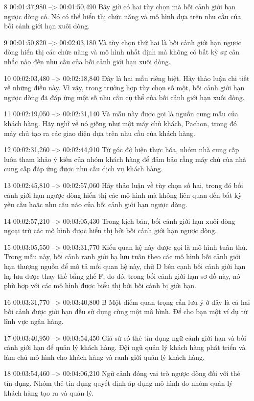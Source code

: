 8
00:01:37,980 --> 00:01:50,490
Bây giờ có hai tùy chọn mà bối cảnh giới hạn ngược dòng có.  Nó có thể hiển thị chức năng và mô hình dựa trên nhu cầu của bối cảnh giới hạn xuôi dòng.

9
00:01:50,820 --> 00:02:03,180
Và tùy chọn thứ hai là bối cảnh giới hạn ngược dòng hiển thị các chức năng và mô hình nhất định mà không có bất kỳ sự cân nhắc nào đến nhu cầu của bối cảnh giới hạn xuôi dòng.

10
00:02:03,480 --> 00:02:18,840
Đây là hai mẫu riêng biệt.  Hãy thảo luận chi tiết về những điều này.  Vì vậy, trong trường hợp tùy chọn số một, bối cảnh giới hạn ngược dòng đã đáp ứng một số nhu cầu cụ thể của bối cảnh giới hạn xuôi dòng.

11
00:02:19,050 --> 00:02:31,140
Và mẫu này được gọi là nguồn cung mẫu của khách hàng.  Hãy nghĩ về nó giống như một máy chủ khách, Pachon, trong đó máy chủ tạo ra các giao diện dựa trên nhu cầu của khách hàng.

12
00:02:31,260 --> 00:02:44,910
Từ góc độ hiện thực hóa, nhóm nhà cung cấp luôn tham khảo ý kiến ​​​​của nhóm khách hàng để đảm bảo rằng máy chủ của nhà cung cấp đáp ứng được nhu cầu dịch vụ khách hàng.

13
00:02:45,810 --> 00:02:57,060
Hãy thảo luận về tùy chọn số hai, trong đó bối cảnh giới hạn ngược dòng hiển thị các mô hình mà không liên quan đến bất kỳ yêu cầu hoặc nhu cầu nào của bối cảnh giới hạn ngược dòng.

14
00:02:57,210 --> 00:03:05,430
Trong kịch bản, bối cảnh giới hạn xuôi dòng ngoại trừ các mô hình được hiển thị bởi bối cảnh giới hạn ngược dòng.

15
00:03:05,550 --> 00:03:31,770
Kiểu quan hệ này được gọi là mô hình tuân thủ.  Trong mẫu này, bối cảnh ranh giới hạ lưu tuân theo các mô hình bối cảnh giới hạn thượng nguồn để mô tả mối quan hệ này, chữ D bên cạnh bối cảnh giới hạn hạ lưu được thay thế bằng ghế F, do đó, trong bối cảnh giới hạn sơ đồ này, nó phù hợp với các mô hình được biểu thị bởi  bối cảnh bị giới hạn.

16
00:03:31,770 --> 00:03:40,800
B Một điểm quan trọng cần lưu ý ở đây là cả hai bối cảnh được giới hạn đều sử dụng cùng một mô hình.  Để cho bạn một ví dụ từ lĩnh vực ngân hàng.

17
00:03:40,950 --> 00:03:54,450
Giả sử có thẻ tín dụng ngữ cảnh giới hạn và bối cảnh giới hạn để quản lý khách hàng.  Đội ngũ quản lý khách hàng phát triển và làm chủ mô hình cho khách hàng và ranh giới quản lý khách hàng.

18
00:03:54,460 --> 00:04:06,210
Ngữ cảnh đóng vai trò ngược dòng đối với thẻ tín dụng.  Nhóm thẻ tín dụng quyết định áp dụng mô hình do nhóm quản lý khách hàng tạo ra và quản lý.

